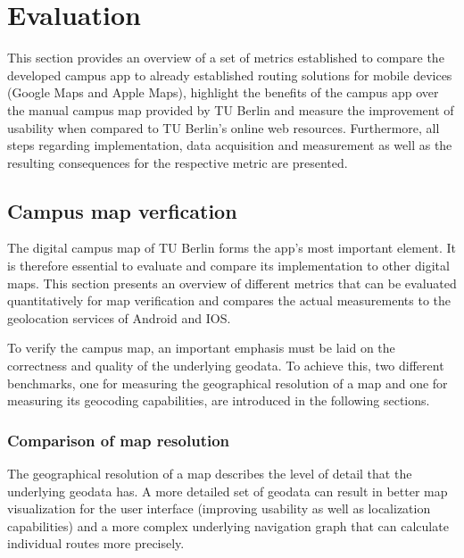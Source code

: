 \chapter{Evaluation}
\label{cha:evaluation}
This section provides an overview of a set of metrics established to compare the developed campus app to already established routing solutions for mobile devices (Google Maps and Apple Maps), highlight the benefits of the campus app over the manual campus map provided by TU Berlin and measure the improvement of usability when compared to TU Berlin's online web resources. Furthermore, all steps regarding implementation, data acquisition and measurement as well as the resulting consequences for the respective metric are presented.

\section{Campus map verfication} \label{sec:campus_map_verification}
The digital campus map of TU Berlin forms the app's most important element. It is therefore essential to evaluate and compare its implementation to other digital maps. This section presents an overview of different metrics that can be evaluated quantitatively for map verification and compares the actual measurements to the geolocation services of Android and IOS.

To verify the campus map, an important emphasis must be laid on the correctness and quality of the underlying geodata. To achieve this, two different benchmarks, one for measuring the geographical resolution of a map and one for measuring its geocoding capabilities, are introduced in the following sections.


\subsection{Comparison of map resolution}
The geographical resolution of a map describes the level of detail that the underlying geodata has. A more detailed set of geodata can result in better map visualization for the user interface (improving usability as well as localization capabilities) and a more complex underlying navigation graph that can calculate individual routes more precisely.

